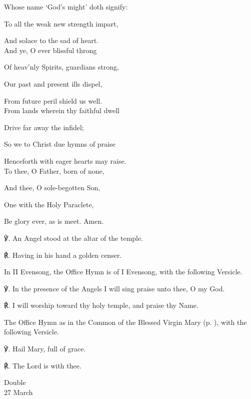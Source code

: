 \begin{paracol}{2}[]
\begin{hangparas}{1.25em}{1}
Whose name `God's might' doth signify:

To all the weak new strength impart,

And solace to the sad of heart.\\

And ye, O ever blissful throng

Of heav'nly Spirits, guardians strong,

Our past and present ills dispel,

From future peril shield us well.\\

From lands wherein thy faithful dwell

Drive far away the infidel;

So we to Christ due hymns of praise

Henceforth with eager hearts may raise.\\

To thee, O Father, born of none,

And thee, O sole-begotten Son,

One with the Holy Paraclete,

Be glory ever, as is meet. Amen.\\
\end{hangparas}

    ℣. An Angel stood at the altar of the temple.

	℟. Having in his hand a golden censer.

\fussy
\end{paracol}

\begin{rubric}
	In II Evensong, the Office Hymn is of I Evensong, with the following Versicle.
\end{rubric}

    ℣. In the presence of the Angels I will sing praise unto thee, O my God.

	℟. I will worship toward thy holy temple, and praise thy Name.



\begin{rubric}
	The Office Hymn as in the Common of the Blessed Virgin Mary (p. \pageref{CommonBVM}), with the following Versicle.
\end{rubric}

    ℣. Hail Mary, full of grace.

	℟. The Lord is with thee.


\begin{inhead}
    {Double\\
27 March}
\end{inhead}

